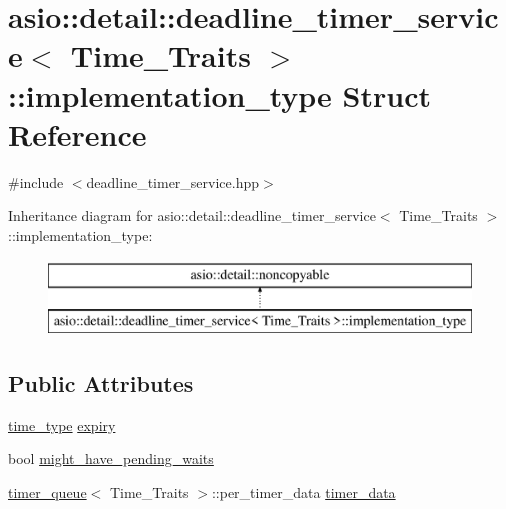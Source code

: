 \hypertarget{structasio_1_1detail_1_1deadline__timer__service_1_1implementation__type}{}\section{asio\+:\+:detail\+:\+:deadline\+\_\+timer\+\_\+service$<$ Time\+\_\+\+Traits $>$\+:\+:implementation\+\_\+type Struct Reference}
\label{structasio_1_1detail_1_1deadline__timer__service_1_1implementation__type}


{\ttfamily \#include $<$deadline\+\_\+timer\+\_\+service.\+hpp$>$}

Inheritance diagram for asio\+:\+:detail\+:\+:deadline\+\_\+timer\+\_\+service$<$ Time\+\_\+\+Traits $>$\+:\+:implementation\+\_\+type\+:\begin{figure}[H]
\begin{center}
\leavevmode
\includegraphics[height=2.000000cm]{structasio_1_1detail_1_1deadline__timer__service_1_1implementation__type}
\end{center}
\end{figure}
\subsection*{Public Attributes}
\begin{DoxyCompactItemize}
\item 
\hyperlink{classasio_1_1detail_1_1deadline__timer__service_a217817497abe6136c056c0facdd3f8aa}{time\+\_\+type} \hyperlink{structasio_1_1detail_1_1deadline__timer__service_1_1implementation__type_a7a00fd79c09c0bfe8da3874da7b9df5d}{expiry}
\item 
bool \hyperlink{structasio_1_1detail_1_1deadline__timer__service_1_1implementation__type_aabd663b0730f0997fb20984dc01bccbf}{might\+\_\+have\+\_\+pending\+\_\+waits}
\item 
\hyperlink{classasio_1_1detail_1_1timer__queue}{timer\+\_\+queue}$<$ Time\+\_\+\+Traits $>$\+::per\+\_\+timer\+\_\+data \hyperlink{structasio_1_1detail_1_1deadline__timer__service_1_1implementation__type_a5991f0ea08712c34c7bfe35559749ebe}{timer\+\_\+data}
\end{DoxyCompactItemize}


